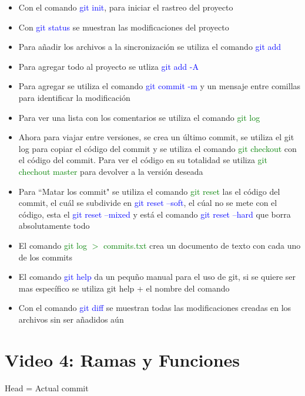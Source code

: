 \documentclass{article}
\begin{document}
	\begin{itemize}
		\item Con el comando \textcolor{blue}{git init}, para iniciar el rastreo del proyecto
		\item Con \textcolor{blue}{git status} se muestran las modificaciones del proyecto
		\item Para añadir los archivos a la sincronización se utiliza el comando \textcolor{blue}{git add}
		\item Para agregar todo al proyecto se utliza \textcolor{blue}{git add -A}
		\item Para agregar se utiliza el comando \textcolor{blue}{git commit -m} y un mensaje entre comillas para identificar la modificación
		\item Para ver una lista con los comentarios se utiliza el comando \textcolor{green}{git log}
		\item Ahora para viajar entre versiones, se crea un último commit, se utiliza el git log para copiar el código del commit y se utiliza el comando \textcolor{green}{git checkout} con el código del commit. Para ver el código en su totalidad se utiliza \textcolor{green}{git chechout master} para devolver a la versión deseada
		\item Para ``Matar los commit" se utiliza el comando \textcolor{green}{git reset} las el código del commit, el cuál se subdivide en \textcolor{blue}{git reset --soft}, el cúal no se mete con el código, esta el \textcolor{blue}{git reset --mixed} y está el comando \textcolor{blue}{git reset --hard} que borra absolutamente todo
		\item El comando \textcolor{green}{git log $>$ commits.txt} crea un documento de texto con cada uno de los commits
		\item El comando \textcolor{blue}{git help} da un pequño manual para el uso de git, si se quiere ser mas específico se utiliza git help + el nombre del comando
		\item Con el comando \textcolor{blue}{git diff} se muestran todas las modificaciones creadas en los archivos sin ser añadidos aún
		
	\end{itemize}


	\section{Video 4: Ramas y Funciones}
	
	Head = Actual commit
	
\end{document}
